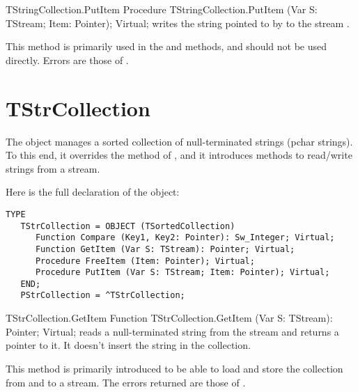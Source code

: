 \begin{procedure}{TStringCollection.PutItem}
\Declaration
Procedure TStringCollection.PutItem (Var S: TStream; Item: Pointer); Virtual;
\Description
{} writes the string pointed to by  to the stream
. 

This method is primarily used in the  and  methods, 
and should not be used directly.
\Errors
Errors are those of .
\SeeAlso
{}
\end{procedure}


\section{TStrCollection}
\label{se:TStrCollection}

The  object manages a sorted collection
of null-terminated strings (pchar strings).  
To this end, it overrides the 
method of , and it introduces methods to read/write
strings from a stream.

Here is the full declaration of the  object:

\begin{verbatim}
TYPE
   TStrCollection = OBJECT (TSortedCollection)
      Function Compare (Key1, Key2: Pointer): Sw_Integer; Virtual;
      Function GetItem (Var S: TStream): Pointer; Virtual;
      Procedure FreeItem (Item: Pointer); Virtual;
      Procedure PutItem (Var S: TStream; Item: Pointer); Virtual;
   END;
   PStrCollection = ^TStrCollection;
\end{verbatim}

\begin{function}{TStrCollection.GetItem}
\Declaration
Function TStrCollection.GetItem (Var S: TStream): Pointer; Virtual;
\Description
{} reads a null-terminated string from the stream  
and returns a pointer  to it. It doesn't insert the string in the 
collection.

This method is primarily introduced to be able to load and store the
collection from and to a stream.
\Errors
The errors returned are those of .
\SeeAlso
{}
\end{function}

